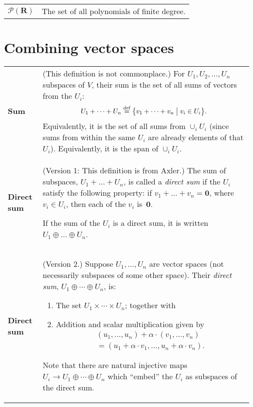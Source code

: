 \documentclass[10pt, a4paper, landscape]{article}
\newcommand{\defn}[1]{\textbf{#1}}
\newcommand{\isdef}{\stackrel{\text{def}}{=}}
\newcommand{\set}[1]{\mathbold{#1}}
\begin{document}
\begin{multicols*}{3}
\begin{tabularx}{\columnwidth}{@{}l>{\raggedright\arraybackslash}X@{}}
  $\mathcal{P}(\set{R})$ & The set of all polynomials of finite degree.

\end{tabularx}


\section*{Combining vector spaces}
\begin{tabularx}{\columnwidth}{@{}l>{\raggedright\arraybackslash}X@{}}
  \toprule
  
  \defn{Sum} & (This definition is not commonplace.) For $U_1, U_2,
  \dotsc, U_n$ subspaces of $V$, their sum is the set of all sums of vectors from the $U_i$:
  \begin{equation*}
    U_1+\dots +U_n \isdef \bigl\{ v_1 + \dots + v_n \bigm\vert v_i \in U_i \bigr\}.
  \end{equation*}
  Equivalently, it is the set of all sums from $\cup_i U_i$ (since sums
  from within the same $U_i$ are already elements of that
  $U_i$). Equivalently, it is the span of $\cup_i U_i$. \\
  
  \defn{Direct sum} & (Version 1: This definition is from Axler.) The
  sum of subspaces, $U_1+\dots + U_n$, is called a \emph{direct sum} if
  the $U_i$ satisfy the following property: if $v_1+\dots +v_n =
  \mathbold{0}$, where $v_i\in U_i$, then each of the $v_i$
  is~$\mathbold{0}$. 

  If the sum of the $U_i$ is a direct sum, it is written $U_1\oplus \dots\oplus U_n$. \\

  \defn{Direct sum} & (Version 2.) Suppose $U_1, \dotsc, U_n$ are vector spaces (not necessarily subspaces of some other space). Their \emph{direct sum}, $U_1\oplus \dotsb \oplus U_n$, is:
  \begin{enumerate}
  \item The set $U_1\times\dotsb \times U_n$; together with 
  \item Addition and scalar multiplication given by
      \begin{multline*}
        (u_1, \dotsc, u_n) + \alpha\cdot (v_1, \dotsc, v_n) \\
        = (u_1 + \alpha\cdot v_1, \dotsc, u_n + \alpha\cdot v_n).
      \end{multline*}
  \end{enumerate}
  Note that there are natural injective maps $U_i\to U_1\oplus\dotsb\oplus U_n$ which “embed” the $U_i$ as subspaces of the direct sum. 


\end{tabularx}
\end{multicols*}
\end{document}
